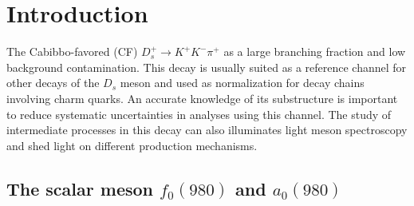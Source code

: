 \section{Introduction}
The Cabibbo-favored (CF) $D_{s}^{+} \rightarrow K^{+}K^{-}\pi^{+}$  as a large branching fraction and low background contamination.
This decay is usually suited as a reference channel for other decays of the $D_{s}$ meson and used as normalization for decay chains involving charm quarks.
An accurate knowledge of its substructure is important to reduce systematic uncertainties in analyses using this channel.
The study of intermediate processes in this decay can also illuminates light meson spectroscopy and shed light on different production mechanisms.
\subsection{The scalar meson $f_{0}(980)$ and $a_{0}(980)$}
\label{f0-a0-discussion}
